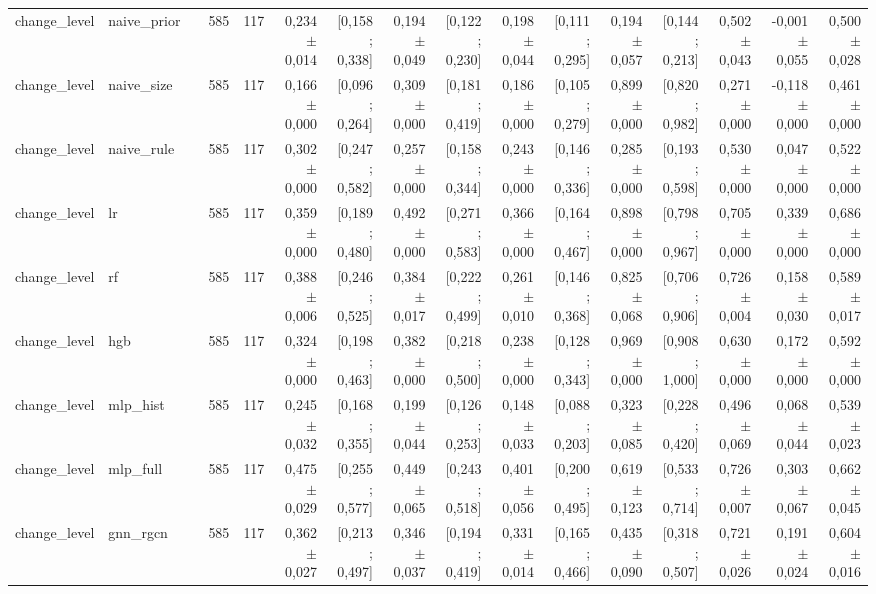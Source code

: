 \begin{table}[htbp]
{\begin{tabular}{llrrrrrrrrrrrrrr}
change\_level & naive\_prior &  & 585 & 117 & 0,234 $\pm$ 0,014 & [0,158 ; 0,338] & 0,194 $\pm$ 0,049 & [0,122 ; 0,230] & 0,198 $\pm$ 0,044 & [0,111 ; 0,295] & 0,194 $\pm$ 0,057 & [0,144 ; 0,213] & 0,502 $\pm$ 0,043 & -0,001 $\pm$ 0,055 & 0,500 $\pm$ 0,028 \\
change\_level & naive\_size &  & 585 & 117 & 0,166 $\pm$ 0,000 & [0,096 ; 0,264] & 0,309 $\pm$ 0,000 & [0,181 ; 0,419] & 0,186 $\pm$ 0,000 & [0,105 ; 0,279] & 0,899 $\pm$ 0,000 & [0,820 ; 0,982] & 0,271 $\pm$ 0,000 & -0,118 $\pm$ 0,000 & 0,461 $\pm$ 0,000 \\
change\_level & naive\_rule &  & 585 & 117 & 0,302 $\pm$ 0,000 & [0,247 ; 0,582] & 0,257 $\pm$ 0,000 & [0,158 ; 0,344] & 0,243 $\pm$ 0,000 & [0,146 ; 0,336] & 0,285 $\pm$ 0,000 & [0,193 ; 0,598] & 0,530 $\pm$ 0,000 & 0,047 $\pm$ 0,000 & 0,522 $\pm$ 0,000 \\
change\_level & lr &  & 585 & 117 & 0,359 $\pm$ 0,000 & [0,189 ; 0,480] & 0,492 $\pm$ 0,000 & [0,271 ; 0,583] & 0,366 $\pm$ 0,000 & [0,164 ; 0,467] & 0,898 $\pm$ 0,000 & [0,798 ; 0,967] & 0,705 $\pm$ 0,000 & 0,339 $\pm$ 0,000 & 0,686 $\pm$ 0,000 \\
change\_level & rf &  & 585 & 117 & 0,388 $\pm$ 0,006 & [0,246 ; 0,525] & 0,384 $\pm$ 0,017 & [0,222 ; 0,499] & 0,261 $\pm$ 0,010 & [0,146 ; 0,368] & 0,825 $\pm$ 0,068 & [0,706 ; 0,906] & 0,726 $\pm$ 0,004 & 0,158 $\pm$ 0,030 & 0,589 $\pm$ 0,017 \\
change\_level & hgb &  & 585 & 117 & 0,324 $\pm$ 0,000 & [0,198 ; 0,463] & 0,382 $\pm$ 0,000 & [0,218 ; 0,500] & 0,238 $\pm$ 0,000 & [0,128 ; 0,343] & 0,969 $\pm$ 0,000 & [0,908 ; 1,000] & 0,630 $\pm$ 0,000 & 0,172 $\pm$ 0,000 & 0,592 $\pm$ 0,000 \\
change\_level & mlp\_hist &  & 585 & 117 & 0,245 $\pm$ 0,032 & [0,168 ; 0,355] & 0,199 $\pm$ 0,044 & [0,126 ; 0,253] & 0,148 $\pm$ 0,033 & [0,088 ; 0,203] & 0,323 $\pm$ 0,085 & [0,228 ; 0,420] & 0,496 $\pm$ 0,069 & 0,068 $\pm$ 0,044 & 0,539 $\pm$ 0,023 \\
change\_level & mlp\_full &  & 585 & 117 & 0,475 $\pm$ 0,029 & [0,255 ; 0,577] & 0,449 $\pm$ 0,065 & [0,243 ; 0,518] & 0,401 $\pm$ 0,056 & [0,200 ; 0,495] & 0,619 $\pm$ 0,123 & [0,533 ; 0,714] & 0,726 $\pm$ 0,007 & 0,303 $\pm$ 0,067 & 0,662 $\pm$ 0,045 \\
change\_level & gnn\_rgcn &  & 585 & 117 & 0,362 $\pm$ 0,027 & [0,213 ; 0,497] & 0,346 $\pm$ 0,037 & [0,194 ; 0,419] & 0,331 $\pm$ 0,014 & [0,165 ; 0,466] & 0,435 $\pm$ 0,090 & [0,318 ; 0,507] & 0,721 $\pm$ 0,026 & 0,191 $\pm$ 0,024 & 0,604 $\pm$ 0,016 \\

\end{tabular}}
\end{table}
